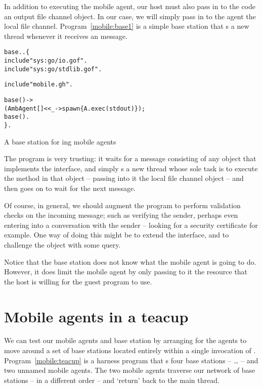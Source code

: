 In addition to executing the mobile agent, our host must also pass in to the code an output file channel object. In our case, we will simply pass in to the agent the local  file channel. Program~\vref{mobile:base1} is a simple base station that s a new thread whenever it receives an  message.

\begin{program}
\begin{alltt}
base .. \{
  include "sys:go/io.gof".
  include "sys:go/stdlib.gof".

  include "mobile.gh".

  base() ->
      ( A\impl{}mbAgent[] << \_ -> spawn \{ A.exec(stdout)\});
      base().
\}.
\end{alltt}
\caption{A base station for ing mobile agents\label{mobile:base1}}
\end{program}
The  program is very trusting: it waits for a message consisting of any object that implements the  interface, and simply s a new thread whose sole task is to execute the  method in that object -- passing into it the local  file channel object -- and then goes on to wait for the next  message.

Of course, in general, we should augment the  program to perform validation checks on the incoming message; such as verifying the sender, perhaps even entering into a conversation with the sender -- looking for a security certificate for example. One way of doing this might be to extend the  interface, and to challenge the object with some query.

Notice that the base station does not know what the mobile agent is going to do. However, it does limit the mobile agent by only passing to it the resource that the host is willing for the guest program to use.

\section{Mobile agents in a teacup}
We can test our mobile agents and base station by arranging for the agents to move around a set of base stations located entirely within a single invocation of \go. Program~\vref{mobile:teacup} is a harness program that s four base stations --  \ldots {} -- and two unnamed mobile agents. The two mobile agents traverse our network of base stations -- in a different order -- and `return' back to the main thread.

